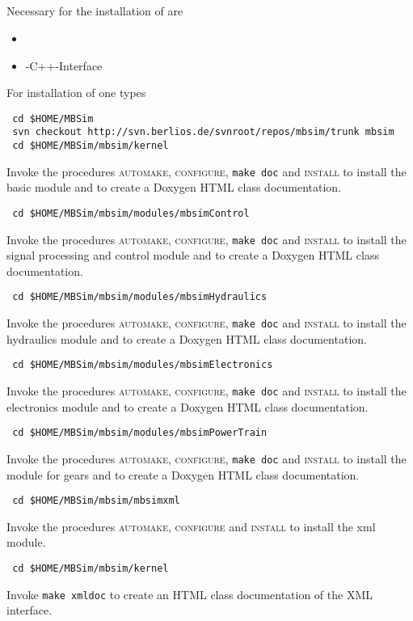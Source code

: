 \subsection{\MBSim}
Necessary for the installation of \MBSim{} are
\begin{itemize}
\item \FMatVec{}
\item \OpenMBV{}-C++-Interface
\end{itemize}
For installation of \MBSim{} one types
\begin{verbatim}
 cd $HOME/MBSim
 svn checkout http://svn.berlios.de/svnroot/repos/mbsim/trunk mbsim
 cd $HOME/MBSim/mbsim/kernel
\end{verbatim}
Invoke the procedures \textsc{automake, configure}, \texttt{make doc} and \textsc{install} to install the basic module and to create a Doxygen HTML class documentation. 
\begin{verbatim}
 cd $HOME/MBSim/mbsim/modules/mbsimControl
\end{verbatim}
Invoke the procedures \textsc{automake, configure}, \texttt{make doc} and \textsc{install} to install the signal processing and control module and to create a Doxygen HTML class documentation. 
\begin{verbatim}
 cd $HOME/MBSim/mbsim/modules/mbsimHydraulics
\end{verbatim}
Invoke the procedures \textsc{automake, configure}, \texttt{make doc} and \textsc{install} to install the hydraulics module and to create a Doxygen HTML class documentation. 
\begin{verbatim}
 cd $HOME/MBSim/mbsim/modules/mbsimElectronics
\end{verbatim}
Invoke the procedures \textsc{automake, configure}, \texttt{make doc} and \textsc{install} to install the electronics module and to create a Doxygen HTML class documentation. 
\begin{verbatim}
 cd $HOME/MBSim/mbsim/modules/mbsimPowerTrain
\end{verbatim}
Invoke the procedures \textsc{automake, configure}, \texttt{make doc} and \textsc{install} to install the module for gears and to create a Doxygen HTML class documentation. 
\begin{verbatim}
 cd $HOME/MBSim/mbsim/mbsimxml
\end{verbatim}
Invoke the procedures \textsc{automake, configure} and \textsc{install} to install the xml module.
\begin{verbatim}
 cd $HOME/MBSim/mbsim/kernel
\end{verbatim}
Invoke \texttt{make xmldoc} to create an HTML class documentation of the XML interface. 


